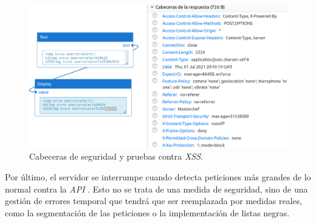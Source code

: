 \begin{figure}[H]
    \centering
    \includegraphics[width=14cm]{img/tables/36_Security.png}
    \caption{Cabeceras de seguridad y pruebas contra \textit{XSS}.}
    \label{fig:securityrecipe}
\end{figure}

Por último, el servidor se interrumpe cuando detecta peticiones más grandes de lo normal contra la \textit{API} . Esto no se trata de una medida de seguridad, sino de una gestión de errores temporal que tendrá que ser reemplazada por medidas reales, como la segmentación de las peticiones o la implementación de listas negras.\n
